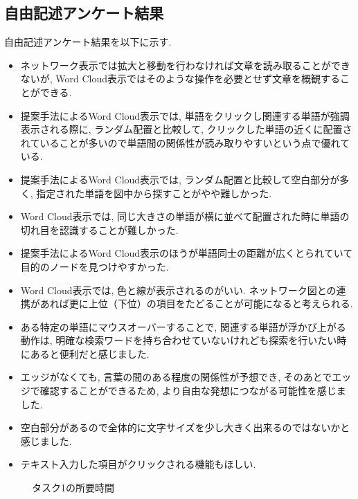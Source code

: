 \documentclass[syuuron]{kuee}
\begin{document}
		\subsection{自由記述アンケート結果}
		自由記述アンケート結果を以下に示す. 
		\begin{itemize}
			\item ネットワーク表示では拡大と移動を行わなければ文章を読み取ることができないが, Word Cloud表示ではそのような操作を必要とせず文章を概観することができる. 
			\item 提案手法によるWord Cloud表示では, 単語をクリックし関連する単語が強調表示される際に, ランダム配置と比較して, クリックした単語の近くに配置されていることが多いので単語間の関係性が読み取りやすいという点で優れている. 
			\item 提案手法によるWord Cloud表示では, ランダム配置と比較して空白部分が多く, 指定された単語を図中から探すことがやや難しかった. 
			\item Word Cloud表示では, 同じ大きさの単語が横に並べて配置された時に単語の切れ目を認識することが難しかった. 
			\item 提案手法によるWord Cloud表示のほうが単語同士の距離が広くとられていて目的のノードを見つけやすかった. 
			\item Word Cloud表示では, 色と線が表示されるのがいい. ネットワーク図との連携があれば更に上位（下位）の項目をたどることが可能になると考えられる. 
			\item ある特定の単語にマウスオーバーすることで, 関連する単語が浮かび上がる動作は, 明確な検索ワードを持ち合わせていないけれども探索を行いたい時にあると便利だと感じました. 
			\item エッジがなくても, 言葉の間のある程度の関係性が予想でき, そのあとでエッジで確認することができるため, より自由な発想につながる可能性を感じました. 
			\item 空白部分があるので全体的に文字サイズを少し大きく出来るのではないかと感じました. 
			\item テキスト入力した項目がクリックされる機能もほしい. 
		\end{itemize}
		\begin{figure}
			\begin{center}
			\end{center}
			\caption{タスク1の所要時間}
	  		\label{fig:res1}
		\end{figure}
\end{document}
